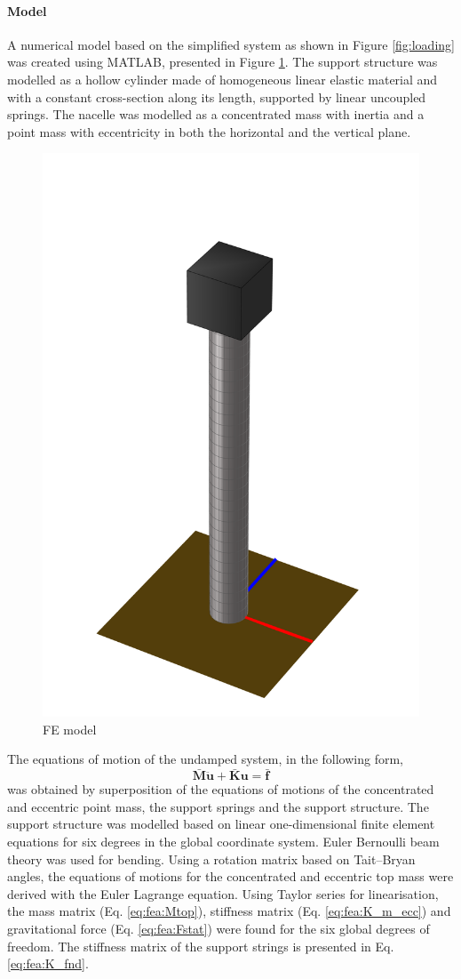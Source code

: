 \documentclass{article}
\begin{document}
\paragraph{Model}
A numerical model based on the simplified system as shown in Figure \ref{fig:loading} was created using MATLAB, presented in Figure \ref{fig:fea:model}. The support structure was modelled as a hollow cylinder made of  homogeneous linear elastic material and with a constant cross-section along its length, supported by linear uncoupled springs. The nacelle was modelled as a concentrated mass with inertia and a point mass with eccentricity in both the horizontal and the vertical plane.
\begin{figure}[ht]
    \centering
    \includegraphics[width=0.7\linewidth]{manuscript/figures/FEModel.png}
    \caption{FE model}
    \label{fig:fea:model}
\end{figure}
The equations of motion of the undamped system, in the following form,
\begin{equation}
\mathbf{\bar{M}}\ddot{\mathbf{u}}+\mathbf{\bar{K}}\mathbf{u} = \mathbf{\bar{f}} 
\end{equation}
was obtained by superposition of the equations of motions of the concentrated and eccentric point mass, the support springs and the support structure. The support structure was modelled based on linear one-dimensional finite element equations for six degrees in the global coordinate system. Euler Bernoulli beam theory was used for bending. Using a rotation matrix based on Tait–Bryan angles, the equations of motions for the concentrated and eccentric top mass were derived with the Euler Lagrange equation. Using Taylor series for linearisation, the  mass matrix (Eq. \ref{eq:fea:Mtop}), stiffness matrix (Eq. \ref{eq:fea:K_m_ecc}) and gravitational force (Eq. \ref{eq:fea:Fstat}) were found for the six global degrees of freedom. The stiffness matrix of the support strings is presented in Eq. \ref{eq:fea:K_fnd}. 
\end{document}
